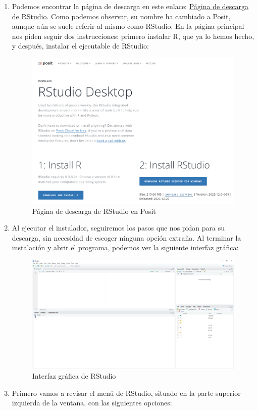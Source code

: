 \documentclass[parskip=full]{scrartcl}
\begin{document}
\begin{enumerate}

\item 
Podemos encontrar la página de descarga en este enlace: \href{https://posit.co/download/rstudio-desktop/}{Página de descarga de RStudio}. Como podemos observar, su nombre ha cambiado a Posit, aunque aún se suele referir al mismo como RStudio. En la página principal nos piden seguir dos instrucciones: primero instalar R, que ya lo hemos hecho, y después, instalar el ejecutable de RStudio:
\begin{figure}[H]
\centering
\includegraphics[width=0.7\linewidth]{images/imagen1.png}
\caption{\label{fig:posit_rstudio}Página de descarga de RStudio en Posit}
\end{figure}

\item
Al ejecutar el instalador, seguiremos los pasos que nos pidan para su descarga, sin necesidad de escoger ninguna opción extraña. Al terminar la instalación y abrir el programa, podemos ver la siguiente interfaz gráfica:
\begin{figure}[H]
\centering
\includegraphics[width=0.7\linewidth]{images/imagen2.png}
\caption{\label{fig:rstudio_graphic_interface}Interfaz gráfica de RStudio}
\end{figure}

\item 
Primero vamos a revisar el menú de RStudio, situado en la parte superior izquierda de la ventana, con las siguientes opciones:


\end{enumerate}
\end{document}
